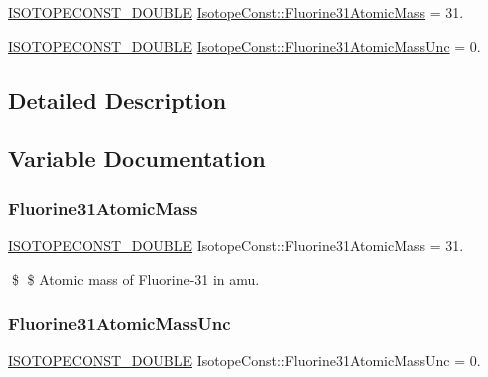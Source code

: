 \begin{DoxyCompactItemize}
\item 
\mbox{\hyperlink{group___isotope_const-_macros_ga8f45a7272ce02c0b4c65c44636ed719a}{I\+S\+O\+T\+O\+P\+E\+C\+O\+N\+S\+T\+\_\+\+D\+O\+U\+B\+LE}} \mbox{\hyperlink{group___isotope_const-_fluorine-_f31_ga07806b12662640e324850afe8dc6521d}{Isotope\+Const\+::\+Fluorine31\+Atomic\+Mass}} = 31.
\item 
\mbox{\hyperlink{group___isotope_const-_macros_ga8f45a7272ce02c0b4c65c44636ed719a}{I\+S\+O\+T\+O\+P\+E\+C\+O\+N\+S\+T\+\_\+\+D\+O\+U\+B\+LE}} \mbox{\hyperlink{group___isotope_const-_fluorine-_f31_gacb846e99b54c683f3d51e582625183cd}{Isotope\+Const\+::\+Fluorine31\+Atomic\+Mass\+Unc}} = 0.
\end{DoxyCompactItemize}


\subsection{Detailed Description}


\subsection{Variable Documentation}
\mbox{\label{group___isotope_const-_fluorine-_f31_ga07806b12662640e324850afe8dc6521d}} 
\subsubsection{\texorpdfstring{Fluorine31\+Atomic\+Mass}{Fluorine31AtomicMass}}
{\footnotesize\ttfamily \mbox{\hyperlink{group___isotope_const-_macros_ga8f45a7272ce02c0b4c65c44636ed719a}{I\+S\+O\+T\+O\+P\+E\+C\+O\+N\+S\+T\+\_\+\+D\+O\+U\+B\+LE}} Isotope\+Const\+::\+Fluorine31\+Atomic\+Mass = 31.}

\$ \$ Atomic mass of Fluorine-\/31 in amu. \mbox{\label{group___isotope_const-_fluorine-_f31_gacb846e99b54c683f3d51e582625183cd}} 
\subsubsection{\texorpdfstring{Fluorine31\+Atomic\+Mass\+Unc}{Fluorine31AtomicMassUnc}}
{\footnotesize\ttfamily \mbox{\hyperlink{group___isotope_const-_macros_ga8f45a7272ce02c0b4c65c44636ed719a}{I\+S\+O\+T\+O\+P\+E\+C\+O\+N\+S\+T\+\_\+\+D\+O\+U\+B\+LE}} Isotope\+Const\+::\+Fluorine31\+Atomic\+Mass\+Unc = 0.}

